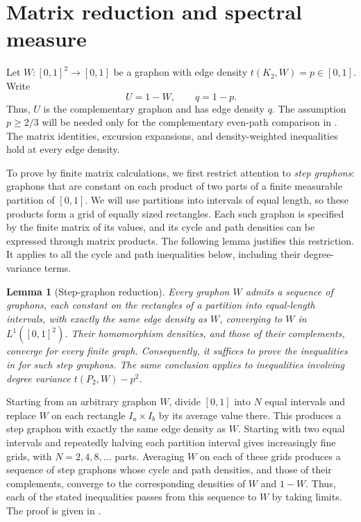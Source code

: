 \documentclass[11pt]{article}
\newtheorem{lemma}[theorem]{Lemma}
\numberwithin{equation}{section}
\newcommand{\tP}[2]{t(P_{#1},#2)}
\newcommand{\edens}[1]{t(K_{2},#1)}
\begin{document}
\section{Matrix reduction and spectral measure}
\label{sec:matrix-reduction}

Let $W\colon[0,1]^2\to[0,1]$ be a graphon with edge density
$\edens W=p\in[0,1]$. Write
\[
  U=1-W,
  \qquad
  q=1-p.
\]
Thus, $U$ is the complementary graphon and has edge density $q$.
The assumption $p\ge2/3$ will be needed only for the complementary even-path comparison in . The matrix identities, excursion expansions, and density-weighted inequalities hold at every edge density.

To prove  by finite matrix calculations, we first restrict attention to \emph{step graphons}: graphons that are constant on each product of two parts of a finite measurable partition of $[0,1]$.
We will use partitions into intervals of equal length, so these products form a grid of equally sized rectangles.
Each such graphon is specified by the finite matrix of its values, and its cycle and path densities can be expressed through matrix products.
The following lemma justifies this restriction. It applies to all the cycle and path inequalities below, including their degree-variance terms.

\begin{lemma}[Step-graphon reduction]
\label{lem:step-reduction}
  Every graphon $W$ admits a sequence of graphons, each constant on
  the rectangles of a partition into equal-length intervals, with
  exactly the same edge density as $W$, converging to $W$ in
  $L^1([0,1]^2)$. Their homomorphism densities, and those of their
  complements, converge for every finite graph. Consequently, it
  suffices to prove the inequalities in
   for such
  step graphons. The same conclusion applies to inequalities
  involving degree variance $\tP2W-p^2$.
\end{lemma}
Starting from an arbitrary graphon $W$, divide $[0,1]$ into $N$ equal intervals and replace $W$ on each rectangle $I_a\times I_b$ by its average value there.
This produces a step graphon with exactly the same edge density as $W$.
Starting with two equal intervals and repeatedly halving each partition interval gives increasingly fine grids, with $N=2,4,8,\ldots$ parts.
Averaging $W$ on each of these grids produces a sequence of step graphons whose cycle and path densities, and those of their complements, converge to the corresponding densities of $W$ and $1-W$.
Thus, each of the stated inequalities passes from this sequence to $W$ by taking limits.
The proof is given in .
\end{document}

